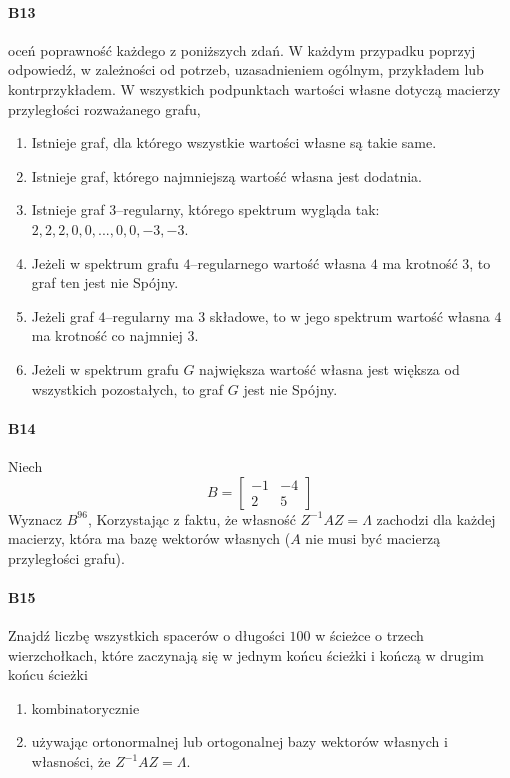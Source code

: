 \paragraph{B13} oceń poprawność każdego z poniższych zdań. W każdym przypadku poprzyj odpowiedź, w zależności od potrzeb, uzasadnieniem ogólnym, przykładem lub kontrprzykładem. W wszystkich podpunktach wartości własne dotyczą macierzy przyległości rozważanego grafu,
\begin{enumerate}[label=\alph*)]
\item  Istnieje graf, dla którego wszystkie wartości własne są takie same.
\item  Istnieje graf, którego najmniejszą wartość własna jest dodatnia.
\item  Istnieje graf $3$–regularny, którego spektrum wygląda tak: $2, 2, 2, 0, 0, . . . , 0, 0, -3, -3$.
\item  Jeżeli w spektrum grafu $4$–regularnego wartość własna $4$ ma krotność $3$, to graf ten jest nie Spójny.
\item  Jeżeli graf $4$–regularny ma $3$ składowe, to w jego spektrum wartość własna $4$ ma krotność co najmniej $3$.
\item  Jeżeli w spektrum grafu $G$ największa wartość własna jest większa od wszystkich pozostałych, to graf $G$ jest nie Spójny.
\end{enumerate}

\paragraph{B14} Niech 
$$B=\begin{bmatrix}
-1&-4\\
2&5
\end{bmatrix}$$
Wyznacz $B^{96}$, Korzystając z faktu, że własność $Z^{-1}AZ = \Lambda$ zachodzi dla każdej macierzy, która ma bazę wektorów własnych ($A$ nie musi być macierzą przyległości grafu).

\paragraph{B15} Znajdź liczbę wszystkich spacerów o długości $100$ w ścieżce o trzech wierzchołkach, które zaczynają się w jednym końcu ścieżki i kończą w drugim końcu ścieżki
\begin{enumerate}[label=\alph*)]
\item kombinatorycznie
\item używając ortonormalnej lub ortogonalnej bazy wektorów własnych i własności, że $Z^{-1}AZ = \Lambda $.
\end{enumerate}

